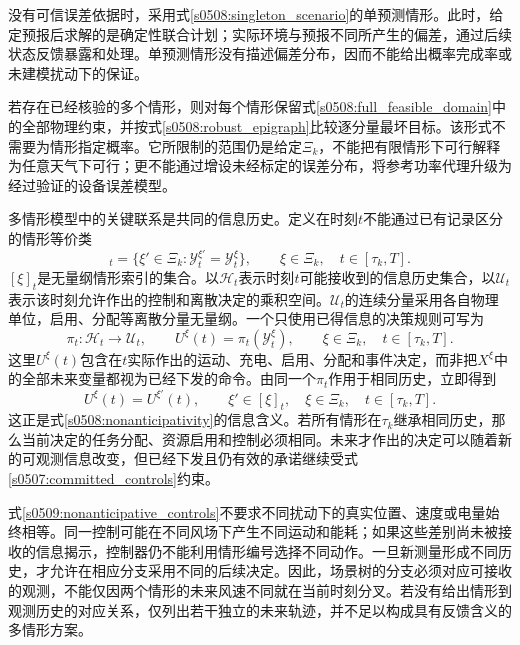 没有可信误差依据时，采用式\eqref{s0508:singleton_scenario}的单预测情形。此时，给定预报后求解的是确定性联合计划；实际环境与预报不同所产生的偏差，通过后续状态反馈暴露和处理。单预测情形没有描述偏差分布，因而不能给出概率完成率或未建模扰动下的保证。

若存在已经核验的多个情形，则对每个情形保留式\eqref{s0508:full_feasible_domain}中的全部物理约束，并按式\eqref{s0508:robust_epigraph}比较逐分量最坏目标。该形式不需要为情形指定概率。它所限制的范围仍是给定$\Xi_k$，不能把有限情形下可行解释为任意天气下可行；更不能通过增设未经标定的误差分布，将参考功率代理升级为经过验证的设备误差模型。

多情形模型中的关键联系是共同的信息历史。定义在时刻$t$不能通过已有记录区分的情形等价类
\begin{equation}
 [\xi]_t
 =\{\xi'\in\Xi_k:\mathcal Y_t^{\xi'}=\mathcal Y_t^\xi\},
 \qquad \xi\in\Xi_k,\quad t\in[\tau_k,T].
 \label{s0509:history_class}
\end{equation}
$[\xi]_t$是无量纲情形索引的集合。以$\mathscr H_t$表示时刻$t$可能接收到的信息历史集合，以$\mathscr U_t$表示该时刻允许作出的控制和离散决定的乘积空间。$\mathscr U_t$的连续分量采用各自物理单位，启用、分配等离散分量无量纲。一个只使用已得信息的决策规则可写为
\begin{equation}
 \pi_t:\mathscr H_t\longrightarrow\mathscr U_t,
 \qquad
 U^\xi(t)=\pi_t(\mathcal Y_t^\xi),
 \qquad \xi\in\Xi_k,\quad t\in[\tau_k,T].
 \label{s0509:history_policy}
\end{equation}
这里$U^\xi(t)$包含在$t$实际作出的运动、充电、启用、分配和事件决定，而非把$X^\xi$中的全部未来变量都视为已经下发的命令。由同一个$\pi_t$作用于相同历史，立即得到
\begin{equation}
 U^\xi(t)=U^{\xi'}(t),
 \qquad
 \xi'\in[\xi]_t,\quad \xi\in\Xi_k,\quad
 t\in[\tau_k,T].
 \label{s0509:nonanticipative_controls}
\end{equation}
这正是式\eqref{s0508:nonanticipativity}的信息含义。若所有情形在$\tau_k$继承相同历史，那么当前决定的任务分配、资源启用和控制必须相同。未来才作出的决定可以随着新的可观测信息改变，但已经下发且仍有效的承诺继续受式\eqref{s0507:committed_controls}约束。

式\eqref{s0509:nonanticipative_controls}不要求不同扰动下的真实位置、速度或电量始终相等。同一控制可能在不同风场下产生不同运动和能耗；如果这些差别尚未被接收的信息揭示，控制器仍不能利用情形编号选择不同动作。一旦新测量形成不同历史，才允许在相应分支采用不同的后续决定。因此，场景树的分支必须对应可接收的观测，不能仅因两个情形的未来风速不同就在当前时刻分叉。若没有给出情形到观测历史的对应关系，仅列出若干独立的未来轨迹，并不足以构成具有反馈含义的多情形方案。

